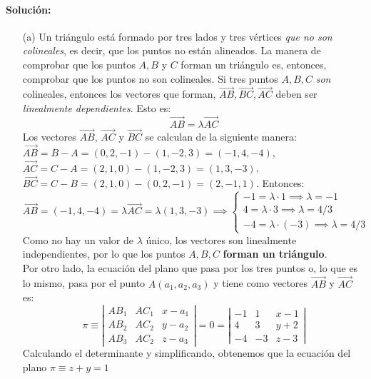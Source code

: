 \paragraph{Solución:}
\begin{enumerate}
    \item[(a)] Un triángulo está formado por tres lados y tres vértices \emph{que no son colineales}, es decir, que los puntos no están alineados. La manera de comprobar que los puntos $A,B$ y $C$ forman un triángulo es, entonces, comprobar que los puntos no son colineales. Si tres puntos $A,B,C$ \emph{son} colineales, entonces los vectores que forman, $\vec{AB}, \Vec{BC}, \Vec{AC}$ deben ser \emph{linealmente dependientes}. Esto es:
    $$
    \Vec{AB}=\lambda \Vec{AC} 
    $$
    Los vectores $\Vec{AB}$, $\Vec{AC}$ y $\Vec{BC}$ se calculan de la siguiente manera: $\Vec{AB} = B-A=(0,2,-1)-(1,-2,3) = (-1,4,-4)$, $\Vec{AC} = C-A = (2,1,0)-(1,-2,3) = (1,3,-3)$, $\Vec{BC}=C-B=(2,1,0)-(0,2,-1) = (2,-1,1)$. Entonces:
    $$
    \Vec{AB}=(-1,4,-4)=\lambda \Vec{AC}=\lambda (1,3,-3) \implies \begin{cases}
         -1=\lambda \cdot 1    \implies \lambda =-1\\
          4=\lambda \cdot 3    \implies \lambda =4/3\\ 
         -4=\lambda \cdot (-3) \implies \lambda =4/3
    \end{cases}
    $$
    Como no hay un valor de $\lambda$ único, los vectores son linealmente independientes, por lo que los puntos $A,B,C$ \textbf{forman un triángulo}. \\

    Por otro lado, la ecuación del plano que pasa por los tres puntos o, lo que es lo mismo, pasa por el punto $A(a_1,a_2,a_3)$ y tiene como vectores $\Vec{AB}$ y $\Vec{AC}$ es:
    $$
    \pi \equiv \left | \begin{array}{ccc}
        AB_1 & AC_1 & x-a_1  \\
        AB_2 & AC_2 & y-a_2  \\
        AB_3 & AC_2 & z-a_3
    \end{array} \right | =0= \left | \begin{array}{ccc}
        -1 &  1 & x-1  \\
         4 &  3 & y+2  \\
        -4 & -3 & z-3
    \end{array} \right |
    $$
    Calculando el determinante y simplificando, obtenemos que la ecuación del plano $\boxed{\pi \equiv z+y=1}$


\end{enumerate}
